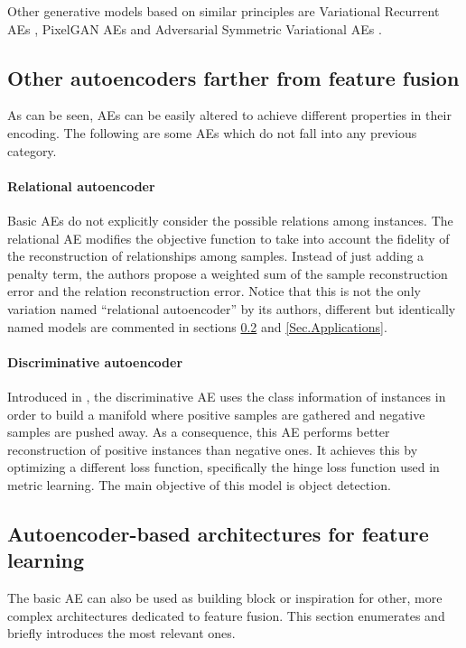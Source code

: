 Other generative models based on similar principles are Variational Recurrent AEs \cite{VRAE}, PixelGAN AEs \cite{PixelGAN} and Adversarial Symmetric Variational AEs \cite{ASVAE}.


\subsection{Other autoencoders farther from feature fusion}\label{Sec.OtherAEs}

As can be seen, AEs can be easily altered to achieve different properties in their encoding. The following are some AEs which do not fall into any previous category.

\paragraph{Relational autoencoder}
Basic AEs do not explicitly consider the possible relations among instances. The relational AE \cite{Meng2017} modifies the objective function to take into account the fidelity of the reconstruction of relationships among samples. Instead of just adding a penalty term, the authors propose a weighted sum of the sample reconstruction error and the relation reconstruction error. Notice that this is not the only variation named ``relational autoencoder'' by its authors, different but identically named models are commented in sections \ref{Sec.AEbased} and \ref{Sec.Applications}.

\paragraph{Discriminative autoencoder} Introduced in \cite{DiscriminativeAE}, the discriminative AE uses the class information of instances in order to build a manifold where positive samples are gathered and negative samples are pushed away. As a consequence, this AE performs better reconstruction of positive instances than negative ones. It achieves this by optimizing a different loss function, specifically the hinge loss function used in metric learning. The main objective of this model is object detection.

\subsection{Autoencoder-based architectures for feature learning} \label{Sec.AEbased}

The basic AE can also be used as building block or inspiration for other, more complex architectures dedicated to feature fusion. This section enumerates and briefly introduces the most relevant ones.

